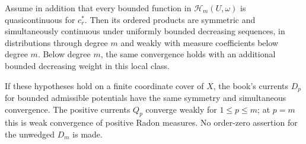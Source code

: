\begin{proposition}\label{draft619:conditional-transfer}
Assume in addition that every bounded function in
$\mathcal H_m(U,\omega)$ is quasicontinuous for $c_r^*$.
Then its ordered products are symmetric and simultaneously continuous
under uniformly bounded decreasing sequences, in distributions through
degree $m$ and weakly with measure coefficients below degree $m$.
Below degree $m$, the same convergence holds with an additional bounded
decreasing weight in this local class.

If these hypotheses hold on a finite coordinate cover of $X$, the
book's currents $D_p$ for bounded admissible potentials have the same
symmetry and simultaneous
convergence. The positive currents $Q_p$ converge weakly for
$1\leq p\leq m$; at $p=m$ this is weak convergence of positive Radon
measures. No order-zero assertion for the unwedged $D_m$ is made.
\end{proposition}
